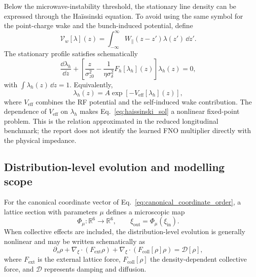 Below the microwave-instability threshold, the stationary line density can be expressed through the Ha\"issinski equation. To avoid using the same symbol for the point-charge wake and the bunch-induced potential, define
\begin{equation}
    \mathcal{V}_{w}[\lambda](z)
    =
    \int_{-\infty}^{\infty}
    W_{\parallel}(z-z')\lambda(z')\,\dd z'.
    \label{eq:haissinski_wake_functional}
\end{equation}
The stationary profile satisfies schematically
\begin{equation}
    \frac{\dd\lambda_h}{\dd z}
    +
    \left[
        \frac{z}{\sigma_{z0}^{2}}
        -\frac{1}{\eta\sigma_{\delta}^{2}}F_h[\lambda_h](z)
    \right]
    \lambda_h(z)
    =0,
    \label{eq:haissinski_diff}
\end{equation}
with $\int\lambda_h(z)\,\dd z=1$. Equivalently,
\begin{equation}
    \lambda_h(z)
    =
    A\exp\!\left[-V_{\mathrm{eff}}[\lambda_h](z)\right],
    \label{eq:haissinski_sol}
\end{equation}
where $V_{\mathrm{eff}}$ combines the RF potential and the self-induced wake contribution. The dependence of $V_{\mathrm{eff}}$ on $\lambda_h$ makes Eq.~\eqref{eq:haissinski_sol} a nonlinear fixed-point problem. This is the relation approximated in the reduced longitudinal benchmark; the report does not identify the learned FNO multiplier directly with the physical impedance.

\subsection{Distribution-level evolution and modelling scope}

For the canonical coordinate vector of Eq.~\eqref{eq:canonical_coordinate_order}, a lattice section with parameters $\mu$ defines a microscopic map
\begin{equation}
    \Phi_{\mu}:\mathbb{R}^{6}\rightarrow\mathbb{R}^{6},
    \qquad
    \xi_{\mathrm{out}}=\Phi_{\mu}(\xi_{\mathrm{in}}).
\end{equation}
When collective effects are included, the distribution-level evolution is generally nonlinear and may be written schematically as
\begin{equation}
    \partial_s\rho
    +\nabla_{\xi}\!\cdot\!\left(F_{\mathrm{ext}}\rho\right)
    +\nabla_{\xi}\!\cdot\!\left(F_{\mathrm{coll}}[\rho]\rho\right)
    =
    \mathcal{D}[\rho],
    \label{eq:generic_vfp_6d_revised}
\end{equation}
where $F_{\mathrm{ext}}$ is the external lattice force, $F_{\mathrm{coll}}[\rho]$ the density-dependent collective force, and $\mathcal{D}$ represents damping and diffusion.


